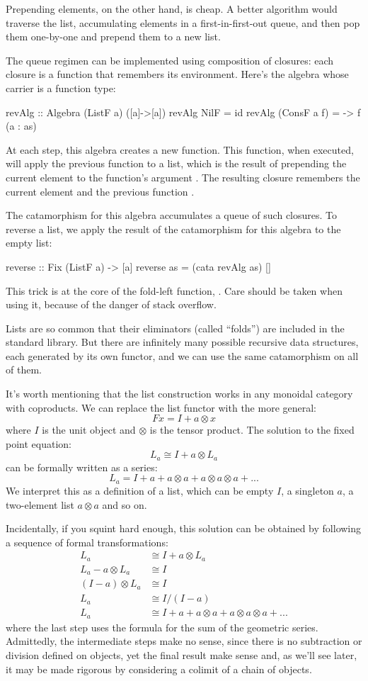 \documentclass[DaoFP]{subfiles}
\begin{document}
Prepending elements, on the other hand, is cheap. A better algorithm would traverse the list, accumulating elements in a first-in-first-out queue, and then pop them one-by-one and prepend them to a new list. 

The queue regimen can be implemented using composition of closures: each closure is a function that remembers its environment. Here's the algebra whose carrier is a function type:
\begin{haskell}
revAlg :: Algebra (ListF a) ([a]->[a])
revAlg NilF = id
revAlg (ConsF a f) = \as -> f (a : as)
\end{haskell}
At each step, this algebra creates a new function. This function, when executed, will apply the previous function  to a list, which is the result of prepending the current element  to the function's argument . The resulting closure remembers the current element  and the previous function .

The catamorphism for this algebra accumulates a queue of such closures. To reverse a list, we apply the result of the catamorphism for this algebra to the empty list:
\begin{haskell}
reverse :: Fix (ListF a) -> [a]
reverse as = (cata revAlg as) []
\end{haskell}
This trick is at the core of the fold-left function, . Care should be taken when using it, because of the danger of stack overflow. 

Lists are so common that their eliminators (called ``folds'') are included in the standard library. But there are infinitely many possible recursive data structures, each generated by its own functor, and we can use the same catamorphism on all of them.

It's worth mentioning that the list construction works in any monoidal category with coproducts. We can replace the list functor with the more general:
\[ F x = I + a \otimes x \]
where $I$ is the unit object and $\otimes$ is the tensor product. The solution to the fixed point equation:
\[ L_a \cong I + a \otimes L_a \]
can be formally written as a series:
\[ L_a = I + a + a \otimes a + a \otimes a \otimes a + ... \]
We interpret this as a definition of a list, which can be empty $I$, a singleton $a$, a two-element list $a \otimes a$ and so on.

Incidentally, if you squint hard enough, this solution can be obtained by following a sequence of formal transformations:
\begin{align*}
L_a &\cong I + a \otimes L_a
\\
L_a - a \otimes L_a &\cong I
\\
(I - a) \otimes L_a &\cong I
\\
L_a &\cong I / (I - a)
\\
L_a &\cong I + a + a \otimes a + a \otimes a \otimes a + ...
\end{align*}
where the last step uses the formula for the sum of the geometric series. Admittedly, the intermediate steps make no sense, since there is no subtraction or division defined on objects, yet the final result make sense and, as we'll see later, it may be made rigorous by considering a colimit of a chain of objects.
\end{document}
